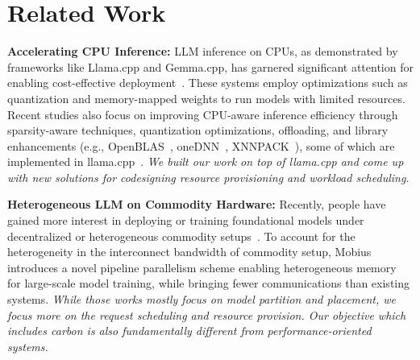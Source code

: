 \section{Related Work}

\textbf{Accelerating CPU Inference:} LLM inference on CPUs, as demonstrated by frameworks like Llama.cpp and Gemma.cpp, has garnered significant attention for enabling cost-effective deployment~\cite{llama_cpp,gemma_cpp}. These systems employ optimizations such as quantization and memory-mapped weights to run models with limited resources. Recent studies also focus on improving CPU-aware inference efficiency through sparsity-aware techniques, quantization optimizations, offloading, and library enhancements (e.g., OpenBLAS~\cite{openblas}, oneDNN~\cite{onednn}, XNNPACK~\cite{xnnpack}), some of which are implemented in llama.cpp~\cite{llama_cpp}. \textit{We built our work on top of llama.cpp and come up with new solutions for codesigning resource provisioning and workload scheduling. }

\textbf{Heterogeneous LLM on Commodity Hardware:} Recently, people have gained more interest in deploying or training foundational models under decentralized or heterogeneous commodity setups~\cite{yuan2022decentralized,scao2022bloom}. To account for the heterogeneity in the interconnect bandwidth of commodity setup, Mobius~\cite{Feng2023} introduces a novel pipeline parallelism scheme enabling heterogeneous memory for large-scale model training, while bringing fewer communications than existing systems. 
\textit{While those works mostly focus on model partition and placement, we focus more on the request scheduling and resource provision. Our objective which includes carbon is also fundamentally different from performance-oriented systems. }


